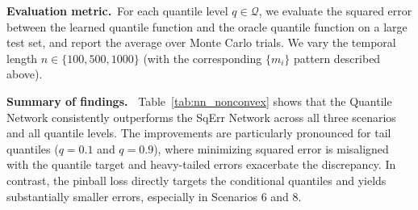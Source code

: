 \documentclass[twoside,11pt]{article}
\newcommand{\rev}[1]{{\color{revisionred}#1}}
\begin{document}
\par\medskip\noindent\textbf{\rev{Evaluation metric.}}\ 
For each quantile level $q\in\mathcal{Q}$, we evaluate the squared error between the learned quantile function and the oracle quantile function on a large test set, and report the average over Monte Carlo trials.
We vary the temporal length $n\in\{100,500,1000\}$ (with the corresponding $\{m_i\}$ pattern described above).

\par\medskip\noindent\textbf{\rev{Summary of findings.}\ }
Table~\ref{tab:nn_nonconvex} shows that the Quantile Network consistently outperforms the SqErr Network across all three scenarios and all quantile levels.
The improvements are particularly pronounced for tail quantiles ($q=0.1$ and $q=0.9$), where minimizing squared error is misaligned with the quantile target and heavy-tailed errors exacerbate the discrepancy.
In contrast, the pinball loss directly targets the conditional quantiles and yields substantially smaller errors, especially in Scenarios 6 and 8.
\end{document}
